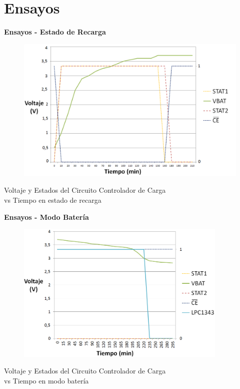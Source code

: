\documentclass[aspectratio=43, handout]{beamer}
\begin{document}
\section{Ensayos}
\begin{frame}{\textbf{\LARGE{Ensayos - Estado de Recarga}}}
\begin{center}
		\begin{figure}[H]
			{\includegraphics[width=1\textwidth]{./imagenes/cargas.png}}
		\end{figure}	
		\vspace{5px} 
		Voltaje y Estados del Circuito Controlador de Carga\\
		vs Tiempo en estado de recarga
\end{center}	  	
\end{frame}

\begin{frame}{\textbf{\LARGE{Ensayos - Modo Batería}}}
\begin{center}
		\begin{figure}[H]
			{\includegraphics[width=0.9\textwidth]{./imagenes/descargas.PNG}}
		\end{figure}	 
		\vspace{10px} 
		Voltaje y Estados del Circuito Controlador de Carga\\
		vs Tiempo en modo batería
\end{center}	 	  	
\end{frame}
\end{document}
